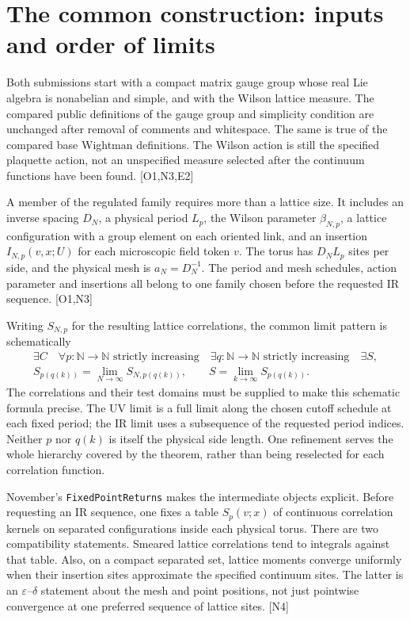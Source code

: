 \documentclass[11pt]{article}
\newcommand{\N}{\mathbb N}
\newcommand{\code}[1]{{\small\nolinkurl{#1}}}
\newcommand{\src}[1]{\textsf{[#1]}}
\begin{document}
\section{The common construction: inputs and order of limits}
\label{sec:limits}

Both submissions start with a compact matrix gauge group whose real Lie
algebra is nonabelian and simple, and with the Wilson lattice measure.
The compared public definitions of the gauge group and simplicity condition
are unchanged after removal of comments and whitespace. The same is true
of the compared base Wightman definitions. The Wilson action is still the
specified plaquette action, not an unspecified measure selected after the
continuum functions have been found. \src{O1,N3,E2}

A member of the regulated family requires more than a lattice size. It
includes an inverse spacing $D_N$, a physical period $L_p$, the Wilson
parameter $\beta_{N,p}$, a lattice configuration with a group element on
each oriented link, and an insertion $I_{N,p}(v,x;U)$ for each microscopic
field token $v$. The torus has $D_N L_p$ sites per side, and the physical mesh
is $a_N=D_N^{-1}$. The period and mesh schedules, action parameter and
insertions all belong to one family chosen before the requested IR sequence.
\src{O1,N3}

Writing $S_{N,p}$ for the resulting lattice correlations, the common limit
pattern is schematically
\begin{equation}\label{eq:limits}
 \begin{gathered}
 \exists C\quad\forall p:\N\to\N\text{ strictly increasing}\quad
 \exists q:\N\to\N\text{ strictly increasing}\quad\exists S,\\
 S_{p(q(k))}=\lim_{N\to\infty}S_{N,p(q(k))},\qquad
 S=\lim_{k\to\infty}S_{p(q(k))}.
 \end{gathered}
\end{equation}
The correlations and their test domains must be supplied to make this
schematic formula precise. The UV limit is a full limit along the chosen
cutoff schedule at each fixed period; the IR limit uses a subsequence of the
requested period indices. Neither $p$ nor $q(k)$ is itself the physical side
length. One refinement serves the whole hierarchy covered by the theorem,
rather than being reselected for each correlation function.

November's \code{FixedPointReturns} makes the intermediate objects explicit.
Before requesting an IR sequence, one fixes a table $S_p(v;x)$ of continuous
correlation kernels on separated configurations inside each physical torus.
There are two compatibility statements. Smeared lattice correlations tend
to integrals against that table. Also, on a compact separated set, lattice
moments converge uniformly when their insertion sites approximate the
specified continuum sites. The latter is an $\varepsilon$--$\delta$ statement
about the mesh and point positions, not just pointwise convergence at one
preferred sequence of lattice sites. \src{N4}
\end{document}
